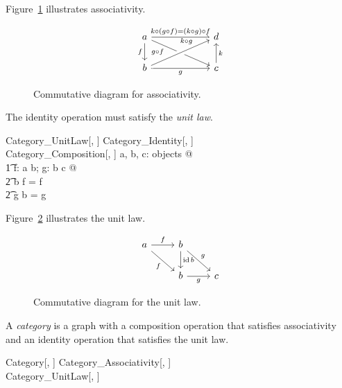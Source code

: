 \documentclass{amsart}
\begin{document}
Figure~\ref{fig:associativity} illustrates associativity.

\begin{figure}[h!]
$$
\begin{tikzcd}[column sep=6em]
a \arrow[swap]{d}{f} 
\arrow{r}{k \compCat (g \compCat f) = (k \compCat g) \compCat f} 
\arrow[swap]{rd}[near start]{g \compCat f} & 
d \\
b \arrow[swap]{r}{g} 
\arrow[crossing over]{ru}[near end]{k \compCat g}& 
c \arrow[swap]{u}{k}
\end{tikzcd}
$$
\caption{Commutative diagram for associativity.}
\label{fig:associativity}
\end{figure}

The identity operation must satisfy the \textit{unit law}.
\begin{schema}{Category\_UnitLaw}[\genO, \genA]
	Category\_Identity[\genO, \genA] \\
	Category\_Composition[\genO, \genA]
\where
	\forall a, b, c: objects @ \\
	\t1	\forall f: a \arrCat b; g: b \arrCat c @ \\
	\t2		\idCat b \compCat f = f \land \\
	\t2		g \compCat \idCat b = g
\end{schema}

Figure~\ref{fig:cd_unit_law} illustrates the unit law.

\begin{figure}[h!]
$$
\begin{tikzcd}
	a \arrow{r}{f} \arrow[swap]{rd}{f}		& b \arrow{d}{\idCat b} \arrow{rd}{g} \\
								& b \arrow[swap]{r}{g}					& c
\end{tikzcd}
$$
\caption{Commutative diagram for the unit law.}
\label{fig:cd_unit_law}
\end{figure}

A \textit{category} is a graph with a composition operation that satisfies associativity and an identity operation that
satisfies the unit law.
\begin{schema}{Category}[\genO, \genA]
	Category\_Associativity[\genO, \genA] \\
	Category\_UnitLaw[\genO, \genA]
\end{schema}
\end{document}
